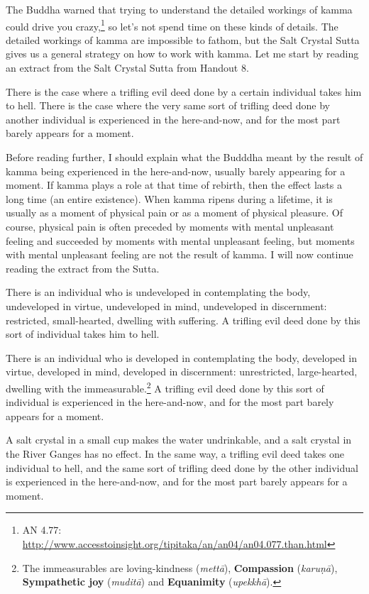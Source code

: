 The Buddha warned that trying to understand the detailed workings of kamma could drive you crazy,\footnote{AN 4.77: \url{http://www.accesstoinsight.org/tipitaka/an/an04/an04.077.than.html}} so let’s not spend time on these kinds of details. The detailed workings of kamma are impossible to fathom, but the Salt Crystal Sutta gives us a general strategy on how to work with kamma. Let me start by reading an extract from the Salt Crystal Sutta from Handout 8.

There is the case where a trifling evil deed done by a certain individual takes him to hell. There is the case where the very same sort of trifling deed done by another individual is experienced in the here-and-now, and for the most part barely appears for a moment.

\color{red}

Before reading further, I should explain what the Budddha meant by the result of kamma being experienced in the here-and-now, usually barely appearing for a moment. If kamma plays a role at that time of rebirth, then the effect lasts a long time (an entire existence). When kamma ripens during a lifetime, it is usually as a moment of physical pain or as a moment of physical pleasure. Of course, physical pain is often preceded by moments with mental unpleasant feeling and succeeded by moments with mental unpleasant feeling, but moments with mental unpleasant feeling are not the result of kamma. I will now continue reading the extract from the Sutta.

\color {black}

There is an individual who is undeveloped in contemplating the body, undeveloped in virtue, undeveloped in mind, undeveloped in discernment: restricted, small-hearted, dwelling with suffering. A trifling evil deed done by this sort of individual takes him to hell.

There is an individual who is developed in contemplating the body, developed in virtue, developed in mind, developed in discernment: unrestricted, large-hearted, dwelling with the immeasurable.\footnote{The immeasurables are loving-kindness (\textit{mettā}), \textbf{Compassion} (\textit{karuṇā}), \textbf{Sympathetic joy} (\textit{muditā}) and \textbf{Equanimity} (\textit{upekkhā}).} A trifling evil deed done by this sort of individual is experienced in the here-and-now, and for the most part barely appears for a moment.

A salt crystal in a small cup makes the water undrinkable, and a salt crystal in the River Ganges has no effect. In the same way, a trifling evil deed takes one individual to hell, and the same sort of trifling deed done by the other individual is experienced in the here-and-now, and for the most part barely appears for a moment.


